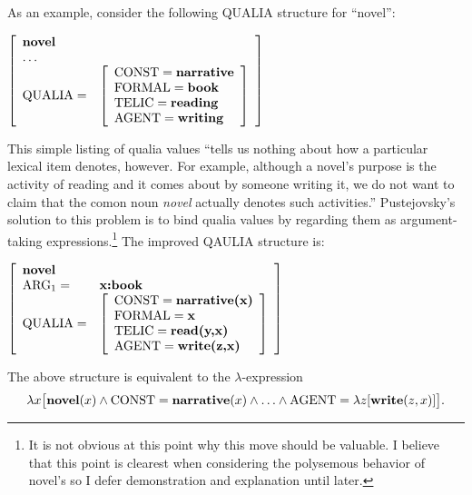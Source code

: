 \documentclass[12pt]{amsart}
\begin{document}
As an example, consider the following QUALIA structure for ``novel'':
\par\vspace{5mm}
$\left[
\begin{array}{l l}
\textbf{novel} & \\
\mathellipsis & \\
\text{QUALIA} = & \left[ \begin{array}{l}
				\text{CONST}=\textbf{narrative} \\
				\text{FORMAL}=\textbf{book} \\
				\text{TELIC}=\textbf{reading} \\
				\text{AGENT}=\textbf{writing}
				\end{array}\right] \\
\end{array}
\right]$
\par\vspace{5mm}
This simple listing of qualia values ``tells us nothing about how a particular lexical item denotes, however. For example, although a novel's purpose is the activity of reading and it comes about by someone writing it, we do not want to claim that the comon noun \emph{novel} actually denotes such activities.'' Pustejovsky's solution to this problem is to bind qualia values by regarding them as argument-taking expressions.\footnote{It is not obvious at this point why this move should be valuable. I believe that this point is clearest when considering the polysemous behavior of novel's so I defer demonstration and explanation until later.} The improved QAULIA structure is:
\par\vspace{5mm}
$\left[
\begin{array}{l l}
\textbf{novel} & \\
\text{ARG}_1 = & \textbf{x:book} \\

\text{QUALIA} = & \left[ \begin{array}{l}
				\text{CONST}=\textbf{narrative(x)} \\
				\text{FORMAL}=\textbf{x} \\
				\text{TELIC}=\textbf{read(y,x)} \\
				\text{AGENT}=\textbf{write(z,x)}
				\end{array}\right] \\
\end{array}
\right]$
\par\vspace{5mm}
\noindent The above structure is equivalent to the $\lambda$-expression
$$\lambda x\bigl[\textbf{novel}(x)\land\text{CONST}=\textbf{narrative}(x)\land\mathellipsis\land\text{AGENT}=\lambda z[\textbf{write}(z,x)]\bigr].$$
\end{document}
